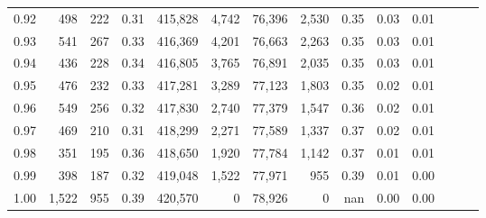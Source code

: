 \begin{tabular}{rrrrrrrrrrrrrr}
0.92 &    498 &    222 &  0.31 &  415,828 &    4,742 &  76,396 &   2,530 &  0.35 &  0.03 &      0.01 \\
0.93 &    541 &    267 &  0.33 &  416,369 &    4,201 &  76,663 &   2,263 &  0.35 &  0.03 &      0.01 \\
0.94 &    436 &    228 &  0.34 &  416,805 &    3,765 &  76,891 &   2,035 &  0.35 &  0.03 &      0.01 \\
0.95 &    476 &    232 &  0.33 &  417,281 &    3,289 &  77,123 &   1,803 &  0.35 &  0.02 &      0.01 \\
0.96 &    549 &    256 &  0.32 &  417,830 &    2,740 &  77,379 &   1,547 &  0.36 &  0.02 &      0.01 \\
0.97 &    469 &    210 &  0.31 &  418,299 &    2,271 &  77,589 &   1,337 &  0.37 &  0.02 &      0.01 \\
0.98 &    351 &    195 &  0.36 &  418,650 &    1,920 &  77,784 &   1,142 &  0.37 &  0.01 &      0.01 \\
0.99 &    398 &    187 &  0.32 &  419,048 &    1,522 &  77,971 &     955 &  0.39 &  0.01 &      0.00 \\
1.00 &  1,522 &    955 &  0.39 &  420,570 &        0 &  78,926 &       0 &   nan &  0.00 &      0.00 \\
\bottomrule
\end{tabular}
